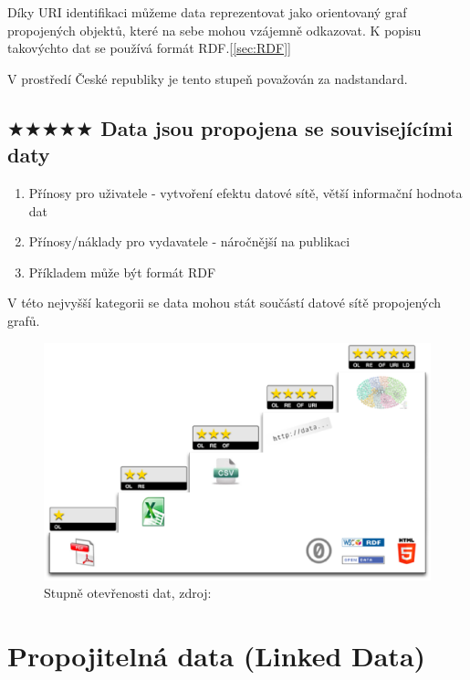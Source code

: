 Díky URI identifikaci můžeme data reprezentovat jako orientovaný graf propojených objektů, které na sebe mohou vzájemně odkazovat. K popisu takovýchto dat se používá formát RDF.[\ref{sec:RDF}]  

V prostředí České republiky je tento stupeň považován za nadstandard.

\subsection*{$\bigstar\bigstar\bigstar\bigstar\bigstar$ Data jsou propojena se souvisejícími daty}

\medskip

\begin{enumerate}
\item Přínosy pro uživatele - vytvoření efektu datové sítě, větší informační hodnota dat    
\item Přínosy/náklady pro vydavatele - náročnější na publikaci
\item Příkladem může být formát RDF
\end{enumerate}

V této nejvyšší kategorii se data mohou stát součástí datové sítě propojených grafů.

\begin{figure}[h]
\centerline{\includegraphics[width=\textwidth]{img/5star_steps.eps}}
\caption[Stupně otevřenosti dat]{Stupně otevřenosti dat, zdroj:\cite{5starInfo}}
\label{obr:5star_steps}
\end{figure}

\newpage

\section{Propojitelná data (Linked Data)}


